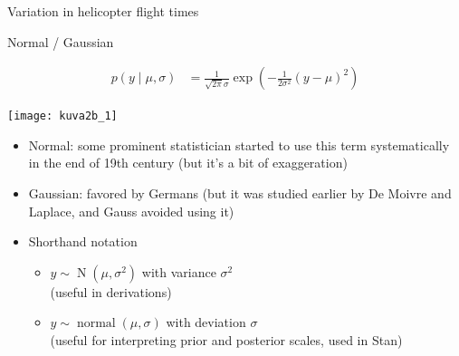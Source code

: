 \documentclass[finnish,english,t]{beamer}
\DeclareMathOperator{\N}{N}
\DeclareMathOperator{\normal}{normal}
\begin{document}
\begin{frame}{Variation in helicopter flight times}

\end{frame}

\begin{frame}{Normal / Gaussian}

    \vspace{-2\baselineskip}
    \begin{align*}
    p({y} \mid \mu,\sigma)&=\frac{1}{\sqrt{2\pi}\sigma}\exp\left(-\frac{1}{2\sigma^2}({y}-\mu)^2\right)
    \end{align*}
    \vspace{-\baselineskip}
  \begin{center}
      \texttt{[image: kuva2b\_1]}
  \end{center}
    \vspace{-\baselineskip}
  \begin{itemize}
  \item<1-> Normal: {\color{gray} some prominent statistician started
      to use this term systematically in the end of 19th century (but
      it's a bit of exaggeration)}
  \item<2-> Gaussian: {\color{gray}favored by Germans (but it was
      studied earlier by De Moivre and Laplace, and Gauss avoided
      using it)}
  \item<3-> Shorthand notation\\
    \begin{itemize}
    \item ${y} \sim \N(\mu,\sigma^2)$ with variance $\sigma^2$\\
      (useful in derivations)
    \item ${y} \sim \normal(\mu,\sigma)$ with deviation $\sigma$\\
      (useful for interpreting prior and posterior scales, used in
      Stan)
    \end{itemize}
  \end{itemize}
  
\end{frame}
\end{document}
